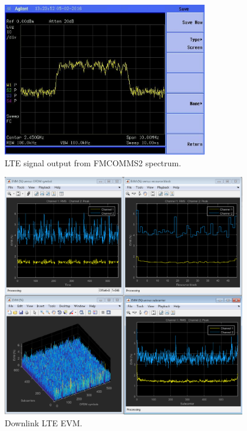 \begin{figure}[htbp]
    \centering
    \includegraphics[width=0.8\textwidth,
    trim={0 0 {.27\textwidth} {.1\textwidth}},
    clip]{./figures/lte_5m}
    \caption{ LTE signal output from FMCOMMS2 spectrum.
    \label{fig:lte5m}}
\end{figure}

%
\begin{figure}[htbp]
    \centering
    \includegraphics[width=0.95\textwidth]{./figures/evm}
    \caption{ Downlink LTE EVM.
    \label{fig:evm}}
\end{figure}
%
\vfill
\clearpage

